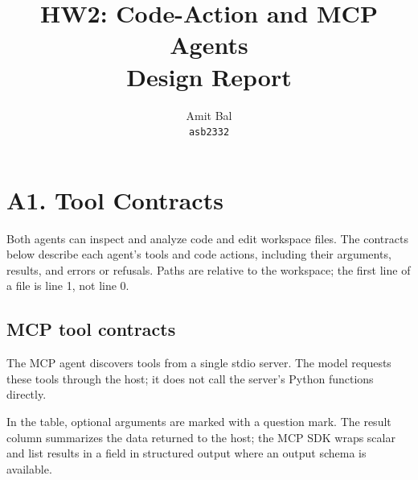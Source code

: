 \documentclass[11pt,letterpaper]{article}
\title{HW2: Code-Action and MCP Agents\\\large Design Report}
\author{Amit Bal \\ \texttt{asb2332}}
\date{}
\newcommand{\code}[1]{\texttt{\detokenize{#1}}}
\begin{document}
\maketitle

\section*{A1. Tool Contracts}

Both agents can inspect and analyze code and edit workspace files. The contracts below describe each agent's tools and code actions, including their arguments, results, and errors or refusals. Paths are relative to the workspace; the first line of a file is line 1, not line 0.

\subsection*{MCP tool contracts}

The MCP agent discovers tools from a single stdio server. The model requests these tools through the host; it does not call the server's Python functions directly.

In the table, optional arguments are marked with a question mark. The result column summarizes the data returned to the host; the MCP SDK wraps scalar and list results in a \code{result} field in structured output where an output schema is available.
\end{document}
